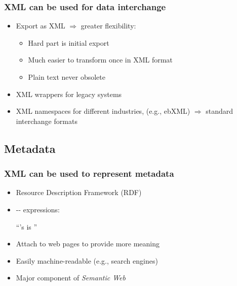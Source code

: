 \frame
{
	\frametitle{XML can be used for data interchange}
	
	\begin{itemize}
	
		\item Export as XML \(\Rightarrow\) greater flexibility:

		\begin{itemize}
		
			\item Hard part is initial export

			\item Much easier to transform once in XML format
			
			\item Plain text never obsolete
		
		\end{itemize}
		
		\item XML wrappers for legacy systems
		
		\item XML namespaces for different industries, (e.g., ebXML)
		\(\Rightarrow\) standard interchange formats

	\end{itemize}
}




\subsection*{Metadata}





\frame
{
	\frametitle{XML can be used to represent metadata}
	
	\begin{itemize}
	
		\item Resource Description Framework (RDF)

		\item {}-- expressions:
		
		``'s  is \BoxHighlight<4>{7001}''
		
		\item Attach to web pages to provide more meaning
		
		\item Easily machine-readable (e.g., search engines)

		\item Major component of \emph{Semantic Web}

	\end{itemize}
}

